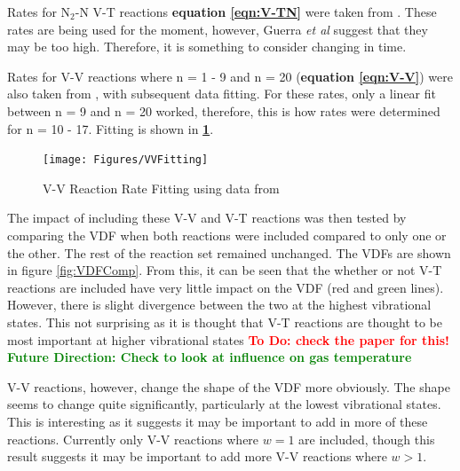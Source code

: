 \documentclass[11pt, oneside]{article}   	%
\newcommand{\todo}[1]{ \textcolor{red}{\bf{To Do:} #1}}
\newcommand{\future}[1]{ \textcolor{green}{\bf{Future Direction: #1}}}
\begin{document}
Rates for N$_2$-N V-T reactions \textbf{equation \ref{eqn:V-TN}} were taken from \cite{Guerra1995non}.
These rates are being used for the moment, however, Guerra \textit{et al} \cite{Guerra2004kinetic} suggest that they may be too high.
Therefore, it is something to consider changing in time.


Rates for V-V reactions where n = 1 - 9 and n = 20 (\textbf{equation \ref{eqn:V-V}}) were also taken from \cite{Billing1979vv}, with subsequent data fitting.
For these rates, only a linear fit between n = 9 and n = 20 worked, therefore, this is how rates were determined for n = 10 - 17.
Fitting is shown in \textbf{\ref{fig:VVFit}}.

\begin{figure}
\begin{center}
\texttt{[image: Figures/VVFitting]}
\caption{V-V Reaction Rate Fitting using data from \cite{Billing1979vv}}
\label{fig:VVFit}
\end{center}
\end{figure}

The impact of including these V-V and V-T reactions was then tested by comparing the VDF when both reactions were included compared to only one or the other. 
The rest of the reaction set remained unchanged.
The VDFs are shown in figure \ref{fig:VDFComp}.
From this, it can be seen that the whether or not V-T reactions are included have very little impact on the VDF (red and green lines).
However, there is slight divergence between the two at the highest vibrational states.
This not surprising as it is thought that V-T reactions are thought to be most important at higher vibrational states \cite{Guerra2004kinetic} \todo{check the paper for this!}
\future{Check to look at influence on gas temperature}

V-V reactions, however, change the shape of the VDF more obviously.
The shape seems to change quite significantly, particularly at the lowest vibrational states.
This is interesting as it suggests it may be important to add in more of these reactions.
Currently only V-V reactions where $w=1$ are included, though this result suggests it may be important to add more V-V reactions where $w > 1$.
%
\end{document}
